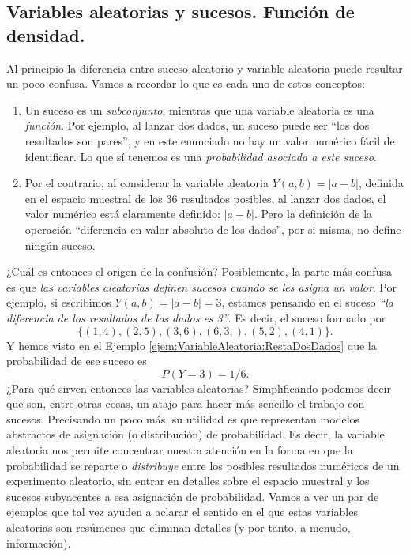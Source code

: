 \subsection{Variables aleatorias y sucesos. Función de densidad.}
\label{cap04:subsec:VariablesAleatoriasSucesos}

Al principio la diferencia entre suceso aleatorio y variable aleatoria puede resultar un poco confusa. Vamos a recordar lo que es cada uno de estos conceptos:
\begin{enumerate}
    \item Un suceso es un {\em subconjunto}, mientras que una variable aleatoria es una {\em función}. Por ejemplo, al lanzar dos dados, un suceso puede ser ``los dos resultados son pares'', y en este enunciado no hay un valor numérico fácil de identificar. Lo que sí tenemos es una {\em probabilidad asociada a este suceso}.
    \item Por el contrario, al considerar la variable aleatoria $Y(a,b)=|a-b|$, definida en el espacio muestral de los 36 resultados posibles, al lanzar dos dados, el valor numérico está claramente definido: $|a-b|$. Pero la definición de la operación {``diferencia en valor absoluto de los dados''}, por si misma, no define ningún suceso.
\end{enumerate}
¿Cuál es entonces el origen de la confusión? Posiblemente, la parte más confusa es que {\sf\em las variables aleatorias definen sucesos cuando se les asigna un valor}. Por ejemplo, si escribimos $Y(a,b)=|a-b|=3$, estamos pensando en el suceso {\em ``la diferencia de los resultados de los dados es 3''}. Es decir, el suceso formado por
\[\{(1,4),(2,5),(3,6),(6,3,),(5,2),(4,1)\}.\]
Y hemos visto en el Ejemplo \ref{ejem:VariableAleatoria:RestaDosDados} que la probabilidad de ese suceso es
\[P(Y=3)=1/6.\]
¿Para qué sirven entonces las variables aleatorias? Simplificando podemos decir que son, entre otras cosas, un atajo para hacer más sencillo el trabajo con sucesos. Precisando un poco más, su utilidad es que representan {\sf modelos abstractos de asignación (o distribución) de probabilidad}. Es decir, la variable aleatoria nos permite concentrar nuestra atención en la forma en que la probabilidad se reparte o {\em distribuye} entre los posibles resultados numéricos de un experimento aleatorio, sin entrar en detalles sobre el espacio muestral y los sucesos subyacentes a esa asignación de probabilidad.  Vamos a ver un par de ejemplos que tal vez ayuden a aclarar el sentido en el que estas variables aleatorias son resúmenes que eliminan detalles (y por tanto, a menudo, información).
